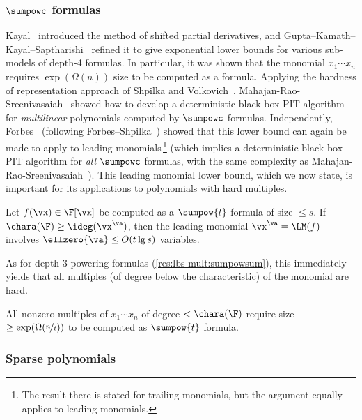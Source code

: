 \documentclass{toc}
\begin{document}
\subsubsection{\texorpdfstring{$\sumpowc$ formulas}{sums of powers of low-degree polynomials}}

Kayal~\cite{Kayal12} introduced the method of shifted partial derivatives, and Gupta--Kamath--Kayal--Saptharishi~\cite{GuptaKKS14} refined it to give exponential lower bounds for various sub-models of depth-4 formulas.  In particular, it was shown that the monomial $x_1\cdots x_n$ requires
%
$\exp(\Omega(n))$ size   %
to be computed as a \sumpowc formula.  Applying the hardness of representation approach of Shpilka and Volkovich~\cite{ShpilkaVolkovich09}, Mahajan-Rao-Sreenivasaiah~\cite{MahajanRS14} showed how to develop a deterministic black-box PIT algorithm for \emph{multilinear} polynomials computed by $\sumpowc$ formulas.  Independently, Forbes~\cite{Forbes15} (following Forbes--Shpilka~\cite{ForbesShpilka13a}) showed that this lower bound can again be made to apply to leading monomials\,\footnote{The result there is stated for trailing monomials, but the argument equally applies to leading monomials.} (which implies a deterministic black-box PIT algorithm for \emph{all} $\sumpowc$ formulas, with the same complexity as Mahajan-Rao-Sreenivasaiah~\cite{MahajanRS14}). This leading monomial lower bound, which we now state, is important for its applications to polynomials with hard multiples.

\begin{theoremwp}\label{res:sumpowsumprodt_TM-ubs}
        Let $f(\vx)\in\F[\vx]$ be computed as a $\sumpow{t}$ formula of size $\le s$.  If $\chara(\F)\ge \ideg(\vx^\va)$, then the leading monomial $\vx^\va=\LM(f)$ involves $\ellzero{\va}\le O(t\lg s)$ variables.
\end{theoremwp}

As for depth-$3$ powering formulas (\autoref{res:lbs-mult:sumpowsum}), this immediately yields that all multiples (of degree below the characteristic) of the monomial are hard.

\begin{corollarywp}\label{res:lbs-mult:sumpowt}
        All nonzero multiples of $x_1\cdots x_n$ of degree $<\chara(\F)$ require size $\ge\exp(\Omega(\nicefrac{n}{t}))$ to be computed as $\sumpow{t}$ formula.
\end{corollarywp}

\subsubsection{Sparse polynomials}
\end{document}
